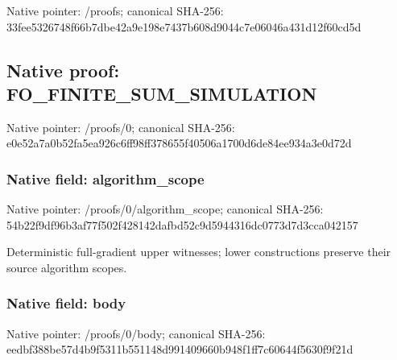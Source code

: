 \documentclass[10pt,a4paper]{article}
\begin{document}
Native pointer: /proofs; canonical SHA-256: 33fee5326748f66b7dbe42a9e198e7437b608d9044c7e06046a431d12f60cd5d

\subsection{Native proof: FO\_\allowbreak{}FINITE\_\allowbreak{}SUM\_\allowbreak{}SIMULATION}
Native pointer: /proofs/0; canonical SHA-256: e0e52a7a0b52fa5ea926c6ff98ff378655f40506a1700d6de84ee934a3e0d72d

\subsubsection{Native field: algorithm\_\allowbreak{}scope}
Native pointer: /proofs/0/algorithm\_\allowbreak{}scope; canonical SHA-256: 54b22f9df96b3af77f502f428142dafbd52c9d5944316dc0773d7d3cca042157

\begingroup\raggedright\sloppy Deterministic full-gradient upper witnesses;\allowbreak{} lower constructions preserve their source algorithm scopes.\par\endgroup

\subsubsection{Native field: body}
Native pointer: /proofs/0/body; canonical SHA-256: eedbf388be57d4b9f5311b551148d991409660b948f1ff7c60644f5630f9f21d
\end{document}
